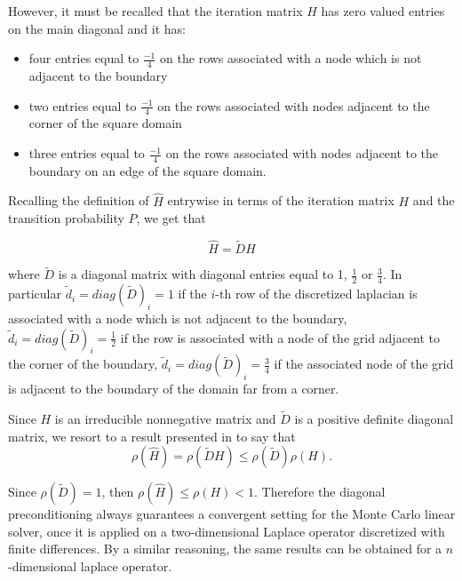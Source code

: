 \documentclass[a4paper,10pt]{article}
\begin{document}
However, it must be recalled that the iteration matrix $H$ has zero
valued entries on the main diagonal and it has:
\begin{itemize}
 \item four entries equal to $\frac{-1}{4}$ on the rows associated
with a node which is not adjacent to the boundary
\item two entries equal to $\frac{-1}{4}$ on the rows associated with nodes
adjacent to the corner of the square domain
\item three entries equal to $\frac{-1}{4}$ on the rows associated with nodes
adjacent to the boundary on an edge of the square domain.
\end{itemize}

Recalling the definition of $\hat{H}$ entrywise in terms of the
iteration matrix $H$ and the transition probability $P$, we get that

\[
 \hat{H}=\tilde{D}H
\]

where $\tilde{D}$ is a diagonal matrix with diagonal entries equal to
1, $\frac{1}{2}$ or $\frac{3}{4}$.
In particular $\tilde{d}_i=diag(\tilde D)_i=1$ if the $i$-th row of the
discretized laplacian is associated with a node which is not adjacent to the
boundary, $\tilde{d}_i=diag(\tilde D)_i=\frac{1}{2}$ if the row is associated
with a node of the grid adjacent to the corner of the boundary,
$\tilde{d}_i=diag(\tilde D)_i=\frac{3}{4}$ if the associated node of the grid
is adjacent to the boundary of the domain far from a corner.

Since $H$ is an irreducible nonnegative matrix and $\tilde{D}$ is a
positive definite diagonal matrix, we resort to a result presented in
\cite{FK1975} to say that
\[
 \rho(\hat{H})=\rho(\tilde{D}H)\le \rho(\tilde D)\rho(H).
\]

Since $\rho(\tilde{D})=1$, then $\rho(\hat{H})\le \rho(H)<1$.
Therefore the diagonal preconditioning always guarantees a convergent
setting for the Monte Carlo linear solver, once it is applied on a
two-dimensional Laplace
operator discretized with finite differences. By a similar reasoning, the same
results can be obtained for a $n$-dimensional laplace operator.
\end{document}
